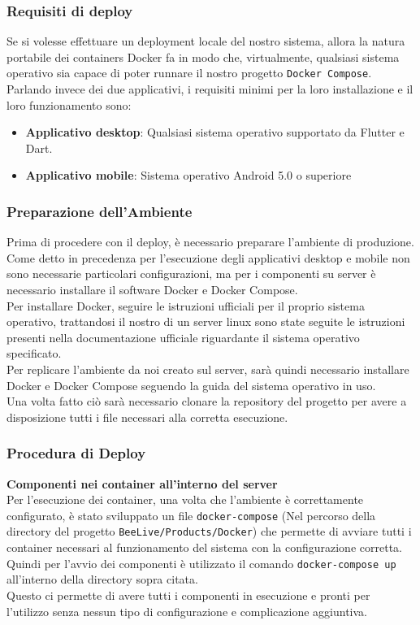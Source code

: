 \documentclass{article}
\begin{document}
\subsubsection{Requisiti di deploy}
Se si volesse effettuare un deployment locale del nostro sistema, allora la natura portabile dei containers Docker fa in modo che, virtualmente, qualsiasi sistema operativo sia capace di poter runnare il nostro progetto \texttt{Docker Compose}.\\
Parlando invece dei due applicativi, i requisiti minimi per la loro installazione e il loro funzionamento sono:
\begin{itemize}
    \item \textbf{Applicativo desktop}: Qualsiasi sistema operativo supportato da Flutter e Dart.
    \item \textbf{Applicativo mobile}: Sistema operativo Android 5.0 o superiore
\end{itemize}

\subsubsection{Preparazione dell'Ambiente}
Prima di procedere con il deploy, è necessario preparare l'ambiente di produzione.\\
Come detto in precedenza per l'esecuzione degli applicativi desktop e mobile non sono necessarie particolari configurazioni, ma per i componenti su server è necessario installare il software Docker e Docker Compose.\\
Per installare Docker, seguire le istruzioni ufficiali per il proprio sistema operativo, trattandosi il nostro di un server linux sono state seguite le istruzioni presenti nella documentazione ufficiale riguardante il sistema operativo specificato.\\
Per replicare l'ambiente da noi creato sul server, sarà quindi necessario installare Docker e Docker Compose seguendo la guida del sistema operativo in uso.\\
Una volta fatto ciò sarà necessario clonare la repository del progetto per avere a disposizione tutti i file necessari alla corretta esecuzione.

\subsubsection{Procedura di Deploy}
\textbf{Componenti nei container all'interno del server}\\
Per l'esecuzione dei container, una volta che l'ambiente è correttamente configurato, è stato sviluppato un file \texttt{docker-compose} (Nel percorso della directory del progetto \texttt{BeeLive/Products/Docker}) che permette di avviare tutti i container necessari al funzionamento del sistema con la configurazione corretta.\\
Quindi per l'avvio dei componenti è utilizzato il comando \texttt{docker-compose up} all'interno della directory sopra citata.\\
Questo ci permette di avere tutti i componenti in esecuzione e pronti per l'utilizzo senza nessun tipo di configurazione e complicazione aggiuntiva.\\
\end{document}
